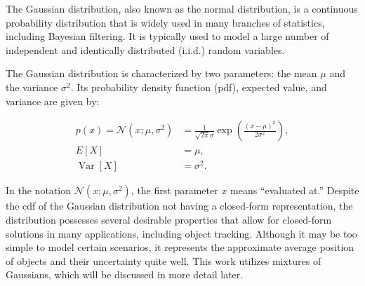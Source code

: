 The Gaussian distribution, also known as the normal distribution, is a 
continuous probability distribution that is widely used in many branches
of statistics, including Bayesian filtering. It is typically used to model
a large number of independent and identically distributed (i.i.d.) random variables.

The Gaussian distribution is characterized by two parameters: the mean 
$\mu$ and the variance $\sigma^2$. Its probability density function (pdf), 
expected value, and variance are given by:

$$
\begin{aligned}
    p(x)
        =\mathscr{N}\left(x ; \mu, \sigma^2\right)
        &=\frac{1}{\sqrt{2 \pi} \sigma} \exp \left(\frac{(x-\mu)^2}{2 \sigma^2}\right), \\
    E[X] &= \mu, \\
    \operatorname{Var}[X] &= \sigma^2.
\end{aligned}
$$

In the notation $\mathscr{N}\left(x ; \mu, \sigma^2\right)$, the first 
parameter $x$ means ``evaluated at.''
Despite the cdf of the Gaussian distribution not having a closed-form 
representation, the distribution possesses several desirable properties that 
allow for closed-form solutions in many applications, including object 
tracking. Although it may be too simple to model certain scenarios, it 
represents the approximate average position of objects and their uncertainty 
quite well. This work utilizes mixtures of Gaussians, which will be discussed 
in more detail later.
